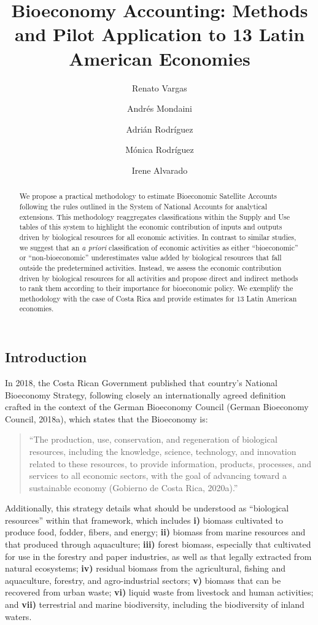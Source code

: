 \documentclass[
  letterpaper,
  DIV=11,
  numbers=noendperiod]{scrartcl}
\title{Bioeconomy Accounting: Methods and Pilot Application to 13 Latin
American Economies}
\author{Renato Vargas \and Andrés Mondaini \and Adrián
Rodríguez \and Mónica Rodríguez \and Irene Alvarado}
\date{}
\begin{document}
\maketitle
\begin{abstract}
We propose a practical methodology to estimate Bioeconomic Satellite
Accounts following the rules outlined in the System of National Accounts
for analytical extensions. This methodology reaggregates classifications
within the Supply and Use tables of this system to highlight the
economic contribution of inputs and outputs driven by biological
resources for all economic activities. In contrast to similar studies,
we suggest that an \emph{a priori} classification of economic activities
as either ``bioeconomic'' or ``non-bioeconomic'' underestimates value
added by biological resources that fall outside the predetermined
activities. Instead, we assess the economic contribution driven by
biological resources for all activities and propose direct and indirect
methods to rank them according to their importance for bioeconomic
policy. We exemplify the methodology with the case of Costa Rica and
provide estimates for 13 Latin American economies.
\end{abstract}

\subsection{Introduction}\label{introduction}

In 2018, the Costa Rican Government published that country's National
Bioeconomy Strategy, following closely an internationally agreed
definition crafted in the context of the German Bioeconomy Council
(German Bioeconomy Council, 2018a), which states that the Bioeconomy is:

\begin{quote}
``The production, use, conservation, and regeneration of biological
resources, including the knowledge, science, technology, and innovation
related to these resources, to provide information, products, processes,
and services to all economic sectors, with the goal of advancing toward
a sustainable economy (Gobierno de Costa Rica, 2020a).''
\end{quote}

Additionally, this strategy details what should be understood as
``biological resources'' within that framework, which includes
\textbf{i)} biomass cultivated to produce food, fodder, fibers, and
energy; \textbf{ii)} biomass from marine resources and that produced
through aquaculture; \textbf{iii)} forest biomass, especially that
cultivated for use in the forestry and paper industries, as well as that
legally extracted from natural ecosystems; \textbf{iv)} residual biomass
from the agricultural, fishing and aquaculture, forestry, and
agro-industrial sectors; \textbf{v)} biomass that can be recovered from
urban waste; \textbf{vi)} liquid waste from livestock and human
activities; and \textbf{vii)} terrestrial and marine biodiversity,
including the biodiversity of inland waters.
\end{document}
